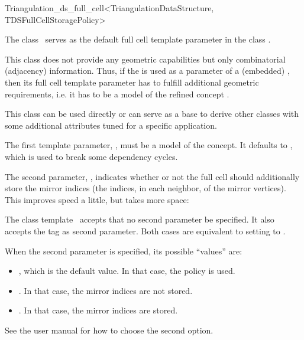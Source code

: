 \begin{ccRefClass}{Triangulation_ds_full_cell<TriangulationDataStructure, TDSFullCellStoragePolicy>}

\ccDefinition

The class \ccRefName\ serves as the default full cell template parameter in the
class .

This class does not provide any geometric capabilities but only combinatorial
(adjacency) information. Thus, if the  is
used as a parameter of a (embedded) , then its full cell template
parameter has to fulfill additional geometric requirements, i.e. it has to be
a model of the refined concept .

This class can be used directly or can serve as a base to derive other classes
with some additional attributes tuned for a specific application.


\ccParameters

The first template parameter, , must be a model of the
 concept. It defaults to , which is
used to break some dependency cycles.

The second parameter, , indicates whether or not
the full cell should additionally store the mirror indices (the indices, in each
neighbor, of the mirror vertices). This improves speed a little, but takes
more space:

The class template \ccRefName\ accepts that no second parameter be specified.
It also accepts the tag  as second parameter. Both cases are
equivalent to setting  to
.

When the second parameter is specified, its possible ``values''
are:\begin{itemize}

\item {}, which is the {default} value. In that case, the
policy  is used.

\item {}. In that case, the mirror
indices are {not stored}.

\item {}. In that case, the mirror
indices are stored.
\end{itemize}
See the user manual  for how to choose the second option.

\ccIsModel


\ccSeeAlso


\end{ccRefClass}
